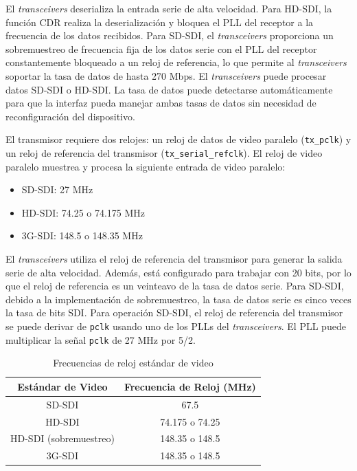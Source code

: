   El \textit{transceivers} deserializa la entrada serie de alta velocidad. Para
  HD-SDI, la función CDR realiza la deserialización y bloquea el PLL del receptor
  a la frecuencia de los datos recibidos. Para SD-SDI, el \textit{transceivers}
  proporciona un sobremuestreo de frecuencia fija de los datos serie con el PLL
  del receptor constantemente bloqueado a un reloj de referencia, lo que permite
  al \textit{transceivers} soportar la tasa de datos de hasta 270 Mbps.
  El \textit{transceivers} puede procesar datos SD-SDI o HD-SDI\@. La tasa de datos
  puede detectarse automáticamente para que la interfaz pueda manejar ambas tasas
  de datos sin necesidad de reconfiguración del dispositivo.

  El transmisor requiere dos relojes: un reloj de datos de video paralelo (\texttt{tx\_pclk})
  y un reloj de referencia del transmisor (\texttt{tx\_serial\_refclk}). El reloj
  de video paralelo muestrea y procesa la siguiente entrada de video paralelo:
  \begin{itemize}
      \item SD-SDI\@: 27 MHz
      \item HD-SDI\@: 74.25 o 74.175 MHz
      \item 3G-SDI\@: 148.5 o 148.35 MHz
  \end{itemize}

  El \textit{transceivers} utiliza el reloj de referencia del transmisor para
  generar la salida serie de alta velocidad. Además, está configurado para
  trabajar con 20 bits, por lo que el reloj de referencia es un veinteavo de la
  tasa de datos serie. Para SD-SDI, debido a la implementación de sobremuestreo,
  la tasa de datos serie es cinco veces la tasa de bits SDI\@.
  Para operación SD-SDI, el reloj de referencia del transmisor se puede derivar
  de \texttt{pclk} usando uno de los PLLs del \textit{transceivers}. El PLL puede
  multiplicar la señal \texttt{pclk} de 27 MHz por 5/2.


  \begin{table}[h]
    \caption{Frecuencias de reloj estándar de video}
    \centering
    \begin{tabular}{|c|c|}
      \toprule
      \textbf{Estándar de Video}  & \textbf{Frecuencia de Reloj (MHz)} \\
      \midrule
      SD-SDI                      & 67.5 \\
      HD-SDI                      & 74.175 o 74.25 \\
      HD-SDI (sobremuestreo)      & 148.35 o 148.5 \\
      3G-SDI                      & 148.35 o 148.5 \\
      \bottomrule
    \end{tabular}
  \end{table}

